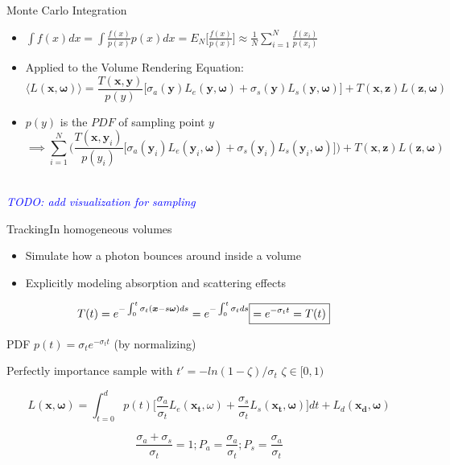 \documentclass[
  english,            %
  aspectratio=169,    %
]{tumbeamer}
\newcommand\todo[1]{\textit{\textcolor{blue}{\\TODO: #1\\}}}
\newcommand\bx[0]{\bm{x}}
\newcommand\by[0]{\bm{y}}
\newcommand\bomega[0]{\bm{\omega}}
\begin{document}
\begin{frame}{Monte Carlo Integration}
\begin{itemize}
    \item $\int f(x)dx = \int \frac{f(x)}{p(x)}p(x) dx 
        = E_N\Big[ \frac{f(x)}{p(x)} \Big]
        \approx \frac{1}{N} \sum\limits_{i=1}^N \frac{f(x_i)}{p(x_i)}$
    \item Applied to the Volume Rendering Equation:
    $$\langle L(\bx, \bomega) \rangle = 
        \frac{T(\bx, \by)}{p(y)}
        \big[ 
            \sigma_a(\by)L_e(\by, \bomega) + 
            \sigma_s(\by)L_s(\by, \bomega)
        \big] 
        + 
        T(\bx, \textbf{z})L(\textbf{z},\bomega)$$
    \item $p(y)$ is the $PDF$ of sampling point $y$
        $$\implies
         \sum\limits_{i=1}^N \Big(
        \frac{T(\bx, \by_i)}{p(y_i)}
        \big[ 
            \sigma_a(\by_i)L_e(\by_i, \bomega) + 
            \sigma_s(\by_i)L_s(\by_i, \bomega)
        \big] \Big)
        + 
        T(\bx, \textbf{z})L(\textbf{z},\bomega)
        $$
\end{itemize}
\todo{add visualization for sampling}
\end{frame}

\begin{frame}{Tracking}{In homogeneous volumes}
    \begin{itemize}
        \item Simulate how a photon bounces around inside a volume
        \item Explicitly modeling absorption and scattering effects
    \end{itemize}
\begin{align}
    T(t) = e^{-\int_0^t \sigma_t(\bx-s\bomega)ds} = e^{-\int_0^t \sigma_t ds} 
    \Aboxed{= e^{-\sigma_t t} = T(t)}
\end{align}

PDF $p(t) = \sigma_t e^{-\sigma_t t}$ (by normalizing) 

Perfectly importance sample with $t' = -ln(1-\zeta)/\sigma_t$ 
\hfill $\zeta \in [0,1)$

\begin{equation}
    L(\bm{x}, \bm{\omega}) = \int_{t=0}^{d} p(t) 
    \Big[ \frac{\sigma_a}{\sigma_t} L_e(\bm{x_t}, \omega)
    + \frac{\sigma_s}{\sigma_t} L_s(\bm{x_t}, \bomega)
    \Big]dt + L_d(\bm{x_d}, \bm{\omega})
\end{equation}

\begin{equation}
    \frac{\sigma_a + \sigma_s}{\sigma_t} = 1;
  P_a = \frac{\sigma_a}{\sigma_t}; P_s = \frac{\sigma_a}{\sigma_t}
\end{equation}

\end{frame}
\end{document}
